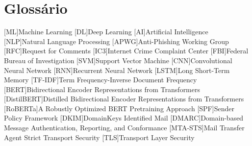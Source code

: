 \chapter{Glossário}

\footnotesize
\SingleSpacing

\begin{multicols}{2}
\begin{acronym}[AAAAAA]

	[ML]{Machine Learning}
	[DL]{Deep Learning}
	[AI]{Artificial Intelligence}
	[NLP]{Natural Language Processing}
	[APWG]{Anti-Phishing Working Group}
	[RFC]{Request for Comments}
	[IC3]{Internet Crime Complaint Center}
	[FBI]{Federal Bureau of Investigation}
	[SVM]{Support Vector Machine}
	[CNN]{Convolutional Neural Network}
	[RNN]{Recurrent Neural Network}
	[LSTM]{Long Short-Term Memory}
	[TF-IDF]{Term Frequency-Inverse Document Frequency}
	[BERT]{Bidirectional Encoder Representations from Transformers}
	[DistilBERT]{Distilled Bidirectional Encoder Representations from Transformers}
	[RoBERTa]{A Robustly Optimized BERT Pretraining Approach}
	[SPF]{Sender Policy Framework}
	[DKIM]{DomainKeys Identified Mail}
	[DMARC]{Domain-based Message Authentication, Reporting, and Conformance}
	[MTA-STS]{Mail Transfer Agent Strict Transport Security}
	[TLS]{Transport Layer Security}

\end{acronym}
\end{multicols}

